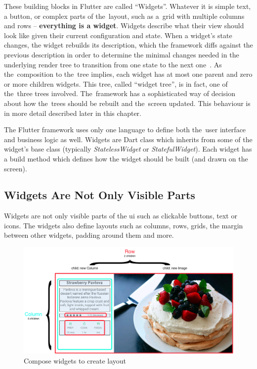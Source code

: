 These building blocks in Flutter are called ``Widgets''. Whatever it is simple text, a button, or complex parts of the~layout, such as a~grid with multiple columns and rows -- \textbf{everything is a widget}.  Widgets describe what their view should look like given their current configuration and state. When a widget's state changes, the widget rebuilds its description, which the framework diffs against the previous description in order to determine the minimal changes needed in the underlying render tree to transition from one state to the next one~\cite{flutter-widget-intro}. As the~composition to the~tree implies, each widget has at most one parent and zero or more children widgets. This tree, called ``widget tree'', is in fact, one of the~three trees involved. The~framework has a sophisticated way of decision about how the~trees should be rebuilt and the~screen updated. This behaviour is in more detail described later in this chapter.

The Flutter framework uses only one language to define both the~user interface and business logic as well.  Widgets are Dart class which inherits from some of the widget's base class (typically \textit{StatelessWidget} or \textit{StatefulWidget}). Each widget has a build method which defines how the widget should be built (and drawn on the screen). 
\subsection{Widgets Are Not Only Visible Parts}
Widgets are not only visible parts of the \gls{ui} such as clickable buttons, text or icons. The widgets also define layouts such as columns, rows, grids, the margin between other widgets, padding around them and more. 

\begin{figure}[htp]
    \centering
    \includegraphics[width=0.9\linewidth]{img/flutter/layout_compose.png}
    \caption{Compose widgets to create layout~\cite{flutter-widget-layout}}
    \label{fig:flutter-compose-widget}
\end{figure}

